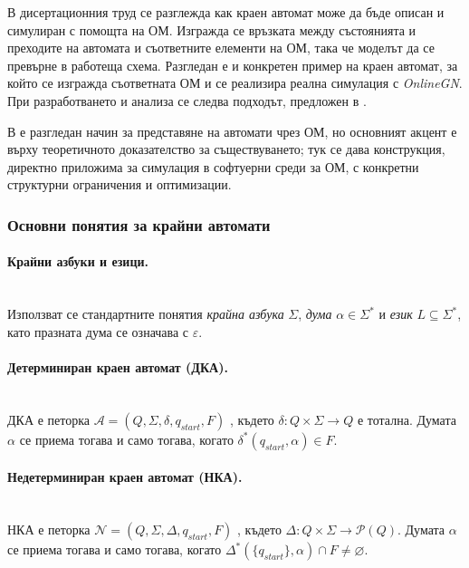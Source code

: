 \hspace*{2.5em}В дисертационния труд се разглежда как краен автомат може да бъде описан и симулиран с помощта на ОМ. Изгражда се връзката между състоянията и преходите на автомата и съответните елементи на ОМ, така че моделът да се превърне в работеща схема. Разгледан е и конкретен пример на краен автомат, за който се изгражда съответната ОМ и се реализира реална симулация с \textit{OnlineGN}. При разработването и анализа се следва подходът, предложен в \cite{DIS-DimitrievAutomata}.

В \cite{DIS-Atanassov1985GNFA} е разгледан начин за представяне на автомати чрез ОМ, но основният акцент е върху теоретичното доказателство за съществуването; тук се дава конструкция, директно приложима за симулация в софтуерни среди за ОМ, с конкретни структурни ограничения и оптимизации.

\subsubsection{Основни понятия за крайни автомати}

\paragraph*{Крайни азбуки и езици.}
\mbox{}\\
Използват се стандартните понятия \emph{крайна азбука} $\Sigma$, \emph{дума} $\alpha \in \Sigma^*$ и \emph{език} $L \subseteq \Sigma^*$, като празната дума се означава с $\varepsilon$.

\paragraph*{Детерминиран краен автомат (ДКА).}
\mbox{}\\
ДКА е петорка $\mathcal{A}=(Q,\Sigma,\delta,q_{\textit{start}},F)$ \cite{DIS-HopcroftMotwaniUllman,DIS-Kozen}, където $\delta:Q\times\Sigma\to Q$ е тотална. Думата $\alpha$ се приема тогава и само тогава, когато $\delta^*(q_{\textit{start}},\alpha)\in F$.

\paragraph*{Недетерминиран краен автомат (НКА).}
\mbox{}\\
НКА е петорка $\mathcal{N}=(Q,\Sigma,\Delta,q_{\textit{start}},F)$ \cite{DIS-HopcroftMotwaniUllman,DIS-Papadimitriou}, където $\Delta:Q\times\Sigma\to\mathcal{P}(Q)$. Думата $\alpha$ се приема тогава и само тогава, когато $\Delta^*(\{q_{\textit{start}}\},\alpha)\cap F\neq\varnothing$.

